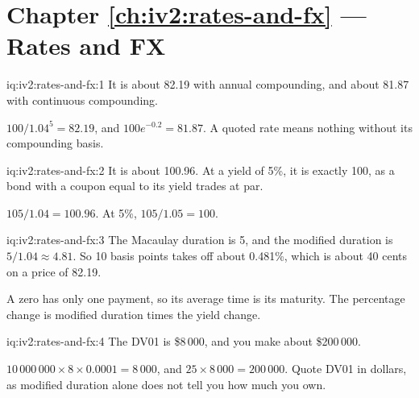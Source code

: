 \section*{Chapter \ref{ch:iv2:rates-and-fx} --- Rates and FX}

\begin{solution}{iq:iv2:rates-and-fx:1}
It is about 82.19 with annual compounding, and about 81.87 with continuous compounding.

$100/1.04^5 = 82.19$, and $100e^{-0.2} = 81.87$. A quoted rate means nothing without its compounding basis.

\end{solution}

\begin{solution}{iq:iv2:rates-and-fx:2}
It is about 100.96. At a yield of 5\%, it is exactly 100, as a bond with a coupon equal to its yield trades at par.

$105/1.04 = 100.96$. At 5\%, $105/1.05 = 100$.

\end{solution}

\begin{solution}{iq:iv2:rates-and-fx:3}
The Macaulay duration is 5, and the modified duration is $5/1.04 \approx 4.81$. So 10 basis points takes off about 0.481\%, which is about 40 cents on a price of 82.19.

A zero has only one payment, so its average time is its maturity. The percentage change is modified duration times the yield change.

\end{solution}

\begin{solution}{iq:iv2:rates-and-fx:4}
The DV01 is \$8\,000, and you make about \$200\,000.

$10\,000\,000 \times 8 \times 0.0001 = 8\,000$, and $25 \times 8\,000 = 200\,000$. Quote DV01 in dollars, as modified duration alone does not tell you how much you own.

\end{solution}

